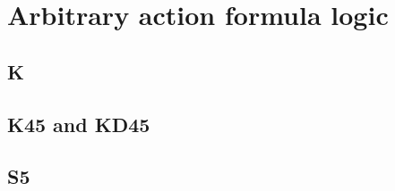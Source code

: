 \chapter{Arbitrary action formula logic}\label{aafl}

\section{K}

\section{K45 and KD45}

\section{S5}
